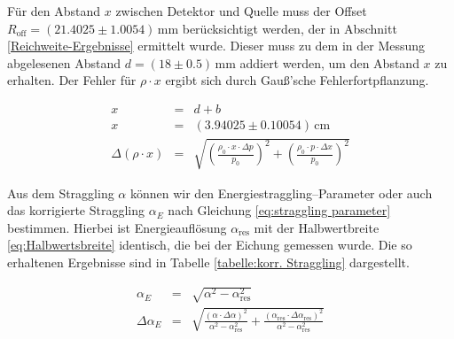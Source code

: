 \documentclass[12pt,a4paper]{scrartcl}
\numberwithin{equation}{section} %
\begin{document}
\noindent
Für den Abstand $x$ zwischen Detektor und Quelle muss der Offset $R_\mathrm{off}=(21.4025 \pm 1.0054) \mathrm{\,mm}$ berücksichtigt werden, der in Abschnitt \ref{Reichweite-Ergebnisse} ermittelt wurde. Dieser muss zu dem in der Messung abgelesenen Abstand $d=(18\pm0.5)\mathrm{\,mm}$ addiert werden, um den Abstand $x$ zu erhalten. Der Fehler für $\rho \cdot x$ ergibt sich durch Gauß'sche Fehlerfortpflanzung.

\begin{eqnarray}
	x &=& d+b\\
	x &=& (3.94025 \pm 0.10054)\mathrm{\,cm} \\
	\Delta (\rho \cdot x) &=& \sqrt{
			\left(\frac{\rho _0 \cdot x \cdot \Delta p}{p_0}\right)^2
			+ \left(\frac{\rho _0 \cdot p \cdot \Delta x}{p_0}\right)^2
		}
\end{eqnarray}

\noindent
Aus dem Straggling $\alpha$ können wir den Energiestraggling--Parameter oder auch das korrigierte Straggling $\alpha_E$ nach Gleichung \eqref{eq:straggling parameter} bestimmen. Hierbei ist Energieauflösung $\alpha _\mathrm{res}$ mit der Halbwertbreite \eqref{eq:Halbwertsbreite} identisch, die bei der Eichung gemessen wurde. Die so erhaltenen Ergebnisse sind in Tabelle \ref{tabelle:korr. Straggling} dargestellt.

\begin{eqnarray}
	\alpha _E&=& \sqrt{\alpha ^2 - \alpha_\mathrm{res}^2} \\
	\Delta \alpha _E&=& \sqrt{
		\frac{(\alpha\cdot\Delta\alpha)^2}{\alpha ^2 - \alpha_\mathrm{res}^2}
		+ \frac{(\alpha_\mathrm{res} \cdot \Delta \alpha_\mathrm{res})^2}{\alpha ^2 - \alpha_\mathrm{res}^2}
	}
\end{eqnarray}
\end{document}
